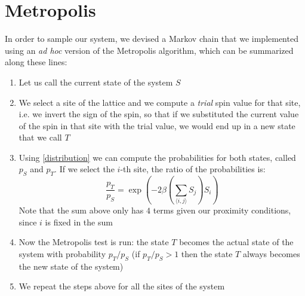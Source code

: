 \documentclass[11pt]{scrartcl} %
\begin{document}
\section{Metropolis}
\label{metropolis}
In order to sample our system, we devised a Markov chain that we implemented using an \textit{ad hoc} version of the Metropolis algorithm, which can be summarized along these lines:
\begin{enumerate}
	\item Let us call the current state of the system $S$
	\item We select a site of the lattice and we compute a \textit{trial} spin value for that site, i.e. we invert the sign of the spin, so that if we substituted the current value of the spin in that site with the trial value, we would end up in a new state that we call $T$ 
	\item Using \eqref{distribution} we can compute the probabilities for both states, called $p_S$ and $p_T$. If we select the $i$-th site, the ratio of the probabilities is:
	\begin{equation}
		\frac{p_T}{p_S} = \exp\left(-2\beta\left(\sum _{\langle i,j \rangle} S_j\right) S_i\right)
	\end{equation}
	Note that the sum above only has $4$ terms given our proximity conditions, since $i$ is fixed in the sum
	\item Now the Metropolis test is run: the state $T$ becomes the actual state of the system with probability $p_T/p_S$ (if $p_T/p_S > 1$ then the state $T$ always becomes the new state of the system)
	\item We repeat the steps above for all the sites of the system
\end{enumerate}
\end{document}
